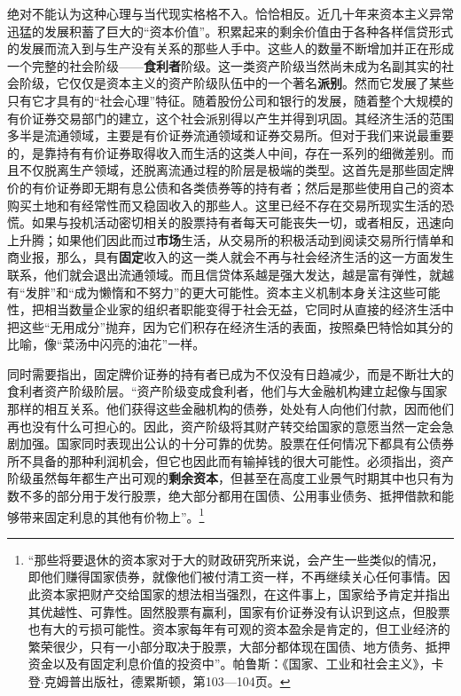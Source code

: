 \documentclass[fontset=fandol, a4paper, 12pt, openright]{ctexbook}
\begin{document}
绝对不能认为这种心理与当代现实格格不入。恰恰相反。近几十年来资本主义异常迅猛的发展积蓄了巨大的“资本价值”。积累起来的剩余价值由于各种各样信贷形式的发展而流入到与生产没有关系的那些人手中。这些人的数量不断增加并正在形成一个完整的社会阶级——\textbf{食利者}阶级。这一类资产阶级当然尚未成为名副其实的社会阶级，它仅仅是资本主义的资产阶级队伍中的一个著名\textbf{派别}。然而它发展了某些只有它才具有的“社会心理”特征。随着股份公司和银行的发展，随着整个大规模的有价证券交易部门的建立，这个社会派别得以产生并得到巩固。其经济生活的范围多半是流通领域，主要是有价证券流通领域和证券交易所。但对于我们来说最重要的，是靠持有有价证券取得收入而生活的这类人中间，存在一系列的细微差别。而且不仅脱离生产领域，还脱离流通过程的阶层是极端的类型。这首先是那些固定牌价的有价证券即无期有息公债和各类债券等的持有者；然后是那些使用自己的资本购买土地和有经常性而又稳固收入的那些人。这里已经不存在交易所现实生活的恐慌。如果与投机活动密切相关的股票持有者每天可能丧失一切，或者相反，迅速向上升腾；如果他们因此而过\textbf{市场}生活，从交易所的积极活动到阅读交易所行情单和商业报，那么，具有\textbf{固定}收入的这一类人就会不再与社会经济生活的这一方面发生联系，他们就会退出流通领域。而且信贷体系越是强大发达，越是富有弹性，就越有“发胖”和“成为懒惰和不努力”的更大可能性。资本主义机制本身关注这些可能性，把相当数量企业家的组织者职能变得于社会无益，它同时从直接的经济生活中把这些“无用成分”抛弃，因为它们积存在经济生活的表面，按照桑巴特恰如其分的比喻，像“菜汤中闪亮的油花”一样。

同时需要指出，固定牌价证券的持有者已成为不仅没有日趋减少，而是不断壮大的食利者资产阶级阶层。“资产阶级变成食利者，他们与大金融机构建立起像与国家那样的相互关系。他们获得这些金融机构的债券，处处有人向他们付款，因而他们再也没有什么可担心的。因此，资产阶级将其财产转交给国家的意愿当然一定会急剧加强。国家同时表现出公认的十分可靠的优势。股票在任何情况下都具有公债券所不具备的那种利润机会，但它也因此而有输掉钱的很大可能性。必须指出，资产阶级虽然每年都生产出可观的\textbf{剩余资本}，但甚至在高度工业景气时期其中也只有为数不多的部分用于发行股票，绝大部分都用在国债、公用事业债务、抵押借款和能够带来固定利息的其他有价物上”。\footnote{“那些将要退休的资本家对于大的财政研究所来说，会产生一些类似的情况，即他们赚得国家债券，就像他们被付清工资一样，不再继续关心任何事情。因此资本家把财产交给国家的想法相当强烈，在这件事上，国家给予肯定并指出其优越性、可靠性。固然股票有赢利，国家有价证券没有认识到这点，但股票也有大的亏损可能性。资本家每年有可观的资本盈余是肯定的，但工业经济的繁荣很少，只有一小部分取决于股票，大部分都体现在国债、地方债务、抵押资金以及有固定利息价值的投资中”。帕鲁斯：《国家、工业和社会主义》，卡登$\cdot$克姆普出版社，德累斯顿，第103—104页。}
\end{document}
